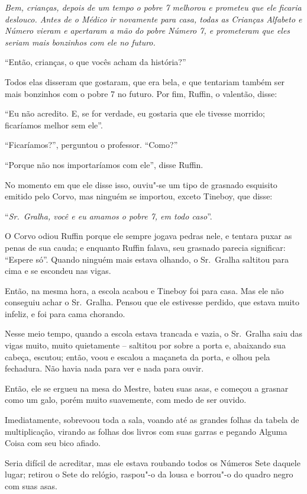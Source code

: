 \emph{Bem, crianças, depois de um tempo o pobre 7 melhorou e prometeu
que ele ficaria deslouco. Antes de o Médico ir novamente para casa,
todas as Crianças Alfabeto e Número vieram e apertaram a mão do pobre
Número 7, e prometeram que eles seriam mais bonzinhos com ele no
futuro.}

\smallskip
``Então, crianças, o que vocês acham da história?''

Todos elas disseram que gostaram, que era bela, e que tentariam também
ser mais bonzinhos com o pobre 7 no futuro. Por fim, Ruffin, o valentão,
disse:

``Eu não acredito. E, se for verdade, eu gostaria que ele tivesse
morrido; ficaríamos melhor sem ele''.

``Ficaríamos?'', perguntou o professor. ``Como?''

``Porque não nos importaríamos com ele'', disse Ruffin.

No momento em que ele disse isso, ouviu"-se um tipo de grasnado esquisito
emitido pelo Corvo, mas ninguém se importou, exceto Tineboy, que disse:

``\emph{Sr.~Gralha, você e eu amamos o pobre 7, em todo caso}''.

O Corvo odiou Ruffin porque ele sempre jogava pedras nele, e tentara
puxar as penas de sua cauda; e enquanto Ruffin falava, seu grasnado
parecia significar: ``Espere só''. Quando ninguém mais estava olhando, o
Sr.~Gralha saltitou para cima e se escondeu nas vigas.

Então, na mesma hora, a escola acabou e Tineboy foi para casa. Mas ele
não conseguiu achar o Sr.~Gralha. Pensou que ele estivesse perdido, que
estava muito infeliz, e foi para cama chorando.

Nesse meio tempo, quando a escola estava trancada e vazia, o Sr.~Gralha
saiu das vigas muito, muito quietamente -- saltitou por sobre a porta e,
abaixando sua cabeça, escutou; então, voou e escalou a maçaneta da
porta, e olhou pela fechadura. Não havia nada para ver e nada para
ouvir.

Então, ele se ergueu na mesa do Mestre, bateu suas asas, e começou a
grasnar como um galo, porém muito suavemente, com medo de ser ouvido.

Imediatamente, sobrevoou toda a sala, voando até as grandes folhas da
tabela de multiplicação, virando as folhas dos livros com suas garras e
pegando Alguma Coisa com seu bico afiado.

Seria difícil de acreditar, mas ele estava roubando todos os Números
Sete daquele lugar; retirou o Sete do relógio, raspou"-o da lousa e
borrou"-o do quadro negro com suas asas.

